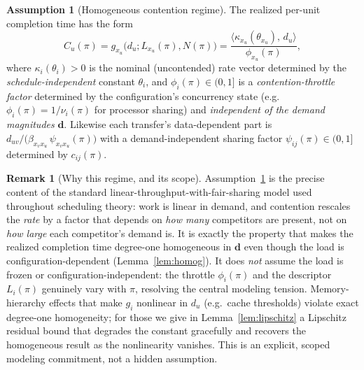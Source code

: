 \documentclass{amsart}
\theoremstyle{definition}
\newtheorem{remark}{Remark}
\newtheorem{assumption}{Assumption}
\begin{document}
\begin{assumption}[Homogeneous contention regime]\label{ass:regime}
The realized per-unit completion time has the form
\begin{equation}\label{eq:Cform}
C_u(\pi)=g_{x_u}\big(d_u;L_{x_u}(\pi),N(\pi)\big)
=\frac{\langle\kappa_{x_u}(\theta_{x_u}),\,d_u\rangle}{\phi_{x_u}(\pi)},
\end{equation}
where $\kappa_i(\theta_i)>0$ is the nominal (uncontended) rate vector
determined by the \emph{schedule-independent} constant $\theta_i$, and
$\phi_i(\pi)\in(0,1]$ is a \emph{contention-throttle factor} determined by the
configuration's concurrency state (e.g.\ $\phi_i(\pi)=1/\nu_i(\pi)$ for
processor sharing) and \emph{independent of the demand magnitudes} $\mathbf d$.
Likewise each transfer's data-dependent part is
$d_{uv}/\big(\beta_{x_vx_u}\,\psi_{x_vx_u}(\pi)\big)$ with a demand-independent
sharing factor $\psi_{ij}(\pi)\in(0,1]$ determined by $c_{ij}(\pi)$.
\end{assumption}

\begin{remark}[Why this regime, and its scope]\label{rem:regime}
Assumption~\ref{ass:regime} is the precise content of the standard
linear-throughput-with-fair-sharing model used throughout scheduling theory:
work is linear in demand, and contention rescales the \emph{rate} by a factor
that depends on \emph{how many} competitors are present, not on \emph{how large}
each competitor's demand is. It is exactly the property that makes the realized
completion time degree-one homogeneous in $\mathbf d$ even though the load is
configuration-dependent (Lemma~\ref{lem:homog}). It does \emph{not} assume the
load is frozen or configuration-independent: the throttle $\phi_i(\pi)$ and the
descriptor $L_i(\pi)$ genuinely vary with $\pi$, resolving the central modeling
tension. Memory-hierarchy effects that make $g_i$ nonlinear in $d_u$ (e.g.\
cache thresholds) violate exact degree-one homogeneity; for those we give in
Lemma~\ref{lem:lipschitz} a Lipschitz residual bound that degrades the constant
gracefully and recovers the homogeneous result as the nonlinearity vanishes.
This is an explicit, scoped modeling commitment, not a hidden assumption.
\end{remark}
\end{document}
